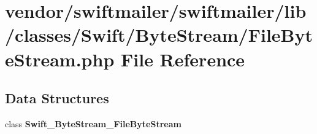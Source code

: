 \section{vendor/swiftmailer/swiftmailer/lib/classes/\+Swift/\+Byte\+Stream/\+File\+Byte\+Stream.php File Reference}
\label{_file_byte_stream_8php}
\subsection*{Data Structures}
\begin{DoxyCompactItemize}
\item 
class {\bf Swift\+\_\+\+Byte\+Stream\+\_\+\+File\+Byte\+Stream}
\end{DoxyCompactItemize}
